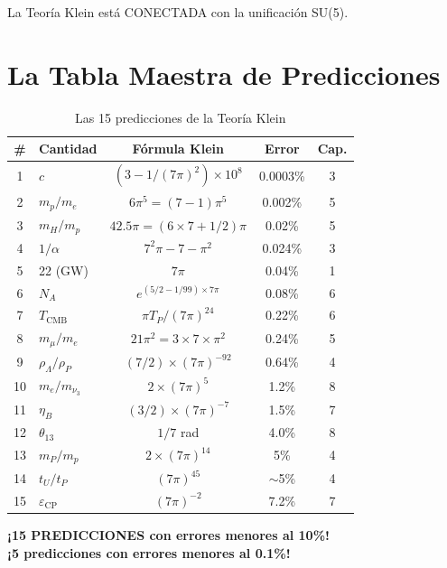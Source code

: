 La Teoría Klein está CONECTADA con la unificación SU(5).


\section{La Tabla Maestra de Predicciones}

\begin{table}[H]
\centering
\small
\caption{Las 15 predicciones de la Teoría Klein}
\begin{tabular}{clccc}
\toprule
\# & \textbf{Cantidad} & \textbf{Fórmula Klein} & \textbf{Error} & \textbf{Cap.} \\
\midrule
1 & $c$ & $(3 - 1/(7\pi)^2) \times 10^8$ & 0.0003\% & 3 \\
2 & $m_p/m_e$ & $6\pi^5 = (7-1)\pi^5$ & 0.002\% & 5 \\
3 & $m_H/m_p$ & $42.5\pi = (6 \times 7 + 1/2)\pi$ & 0.02\% & 5 \\
4 & $1/\alpha$ & $7^2\pi - 7 - \pi^2$ & 0.024\% & 3 \\
5 & 22 (GW) & $7\pi$ & 0.04\% & 1 \\
6 & $N_A$ & $e^{(5/2-1/99) \times 7\pi}$ & 0.08\% & 6 \\
7 & $T_{\text{CMB}}$ & $\pi T_P/(7\pi)^{24}$ & 0.22\% & 6 \\
8 & $m_\mu/m_e$ & $21\pi^2 = 3 \times 7 \times \pi^2$ & 0.24\% & 5 \\
9 & $\rho_\Lambda/\rho_P$ & $(7/2) \times (7\pi)^{-92}$ & 0.64\% & 4 \\
10 & $m_e/m_{\nu_3}$ & $2 \times (7\pi)^5$ & 1.2\% & 8 \\
11 & $\eta_B$ & $(3/2) \times (7\pi)^{-7}$ & 1.5\% & 7 \\
12 & $\theta_{13}$ & $1/7$ rad & 4.0\% & 8 \\
13 & $m_P/m_p$ & $2 \times (7\pi)^{14}$ & 5\% & 4 \\
14 & $t_U/t_P$ & $(7\pi)^{45}$ & $\sim$5\% & 4 \\
15 & $\varepsilon_{\text{CP}}$ & $(7\pi)^{-2}$ & 7.2\% & 7 \\
\bottomrule
\end{tabular}
\end{table}

\begin{center}
\textbf{¡15 PREDICCIONES con errores menores al 10\%!}\\
\textbf{¡5 predicciones con errores menores al 0.1\%!}
\end{center}


